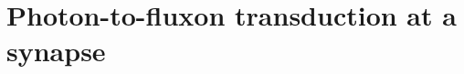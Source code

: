 \documentclass[twocolumn]{article}
\begin{document}
\section{\label{sec:synapse}Photon-to-fluxon transduction at a synapse}

\begin{figure} 
\end{figure}
\end{document}
